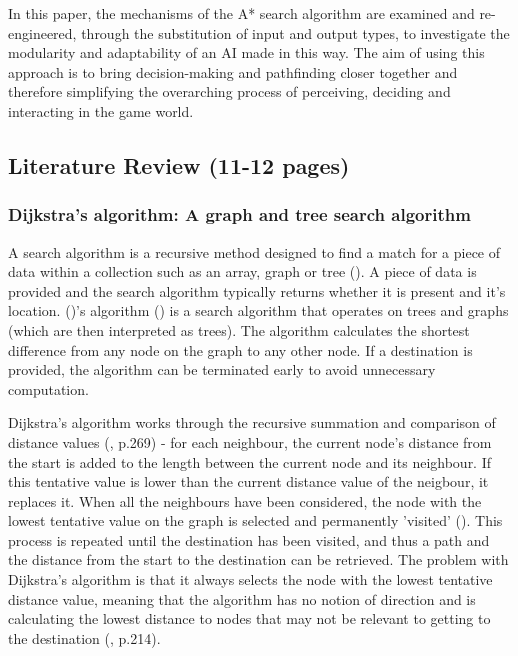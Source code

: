 \documentclass[10pt]{article}
\begin{document}
In this paper, the mechanisms of the A* search algorithm are examined and re-engineered, through the substitution of input and output types, to investigate the modularity and adaptability of an AI made in this way. The aim of using this approach is to bring decision-making and pathfinding closer together and therefore simplifying the overarching process of perceiving, deciding and interacting in the game world.

\subsection{Literature Review (11-12 pages)}

\subsubsection{Dijkstra's algorithm: A graph and tree search algorithm}

A search algorithm is a recursive method designed to find a match for a piece of data within a collection such as an array, graph or tree (\cite{friedman1976algorithm}). A piece of data is provided and the search algorithm typically returns whether it is present and it's location. (\citeauthor{dijkstra1959note})'s algorithm (\citeyear{dijkstra1959note}) is a search algorithm that operates on trees and graphs (which are then interpreted as trees). The algorithm calculates the shortest difference from any node on the graph to any other node. If a destination is provided, the algorithm can be terminated early to avoid unnecessary computation. 

Dijkstra's algorithm works through the recursive summation and comparison of distance values (\cite{dijkstra1959note}, p.269) - for each neighbour, the current node's distance from the start is added to the length between the current node and its neighbour. If this tentative value is lower than the current distance value of the neigbour, it replaces it. When all the neighbours have been considered, the node with the lowest tentative value on the graph is selected and permanently 'visited' (\cite{dijkstra1959note}). This process is repeated until the destination has been visited, and thus a path and the distance from the start to the destination can be retrieved. The problem with Dijkstra's algorithm is that it always selects the node with the lowest tentative distance value, meaning that the algorithm has no notion of direction and is calculating the lowest distance to nodes that may not be relevant to getting to the destination (\cite{millington2019ai}, p.214).
\end{document}
